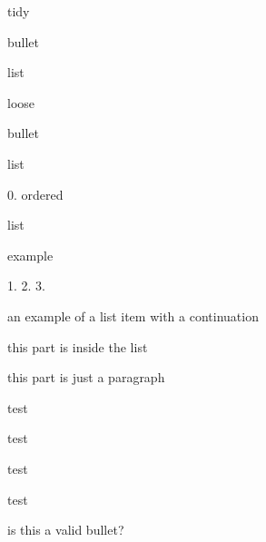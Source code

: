 
\begin{DoxyItemize}
\item tidy
\end{DoxyItemize}

bullet
\begin{DoxyItemize}
\item list
\item loose
\item bullet
\item list
\end{DoxyItemize}

0. ordered
\begin{DoxyEnumerate}
\item list
\item example
\end{DoxyEnumerate}
\begin{DoxyItemize}
\item 
\item 
\item 
\item 
\end{DoxyItemize}

1. 2. 3.


\begin{DoxyItemize}
\item an example of a list item with a continuation

this part is inside the list

this part is just a paragraph ~\newline

\end{DoxyItemize}
\begin{DoxyEnumerate}
\item test
\end{DoxyEnumerate}
\begin{DoxyItemize}
\item test
\end{DoxyItemize}
\begin{DoxyEnumerate}
\item test
\end{DoxyEnumerate}
\begin{DoxyItemize}
\item test
\end{DoxyItemize}

is this a valid bullet?


